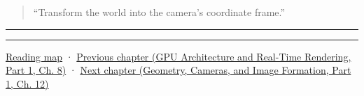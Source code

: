 \begin{quote}
``Transform the world into the camera's coordinate frame.''
\end{quote}

\begin{center}\rule{0.5\linewidth}{0.5pt}\end{center}

\begin{center}\rule{0.5\linewidth}{0.5pt}\end{center}

\hyperref[volume-reading-map]{Reading map} · \href{../06-GPU-Architecture-and-Real-Time-Rendering-P01/main.pdf\#03-visual-computing-i-ch011-bvh-traversal-and-deterministic-evidence}{Previous chapter (GPU Architecture and Real-Time Rendering, Part 1, Ch. 8)} · \href{../03-Geometry-Cameras-and-Image-Formation-P01/main.pdf\#03-visual-computing-i-ch013-from-view-space-to-clip-space}{Next chapter (Geometry, Cameras, and Image Formation, Part 1, Ch. 12)}
